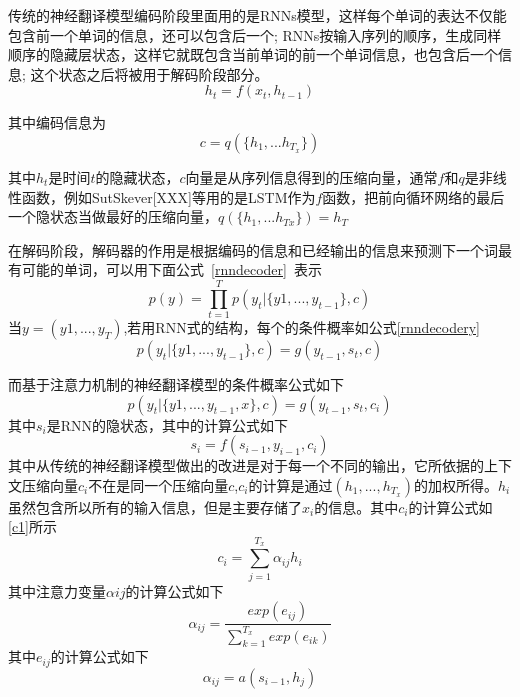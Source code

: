 传统的神经翻译模型编码阶段里面用的是RNNs模型，这样每个单词的表达不仅能包含前一个单词的信息，还可以包含后一个; RNNs按输入序列的顺序，生成同样顺序的隐藏层状态，这样它就既包含当前单词的前一个单词信息，也包含后一个信息; 这个状态之后将被用于解码阶段部分。
\begin{equation}\label{lstm_f} h_t = f(x_t,h_{t-1}) \end{equation}

其中编码信息为
\begin{equation}\label{lstm_f} c = q(\lbrace h_1,...h_{T_x} \rbrace ) \end{equation}

其中$h_t$是时间$t$的隐藏状态，$c$向量是从序列信息得到的压缩向量，通常$f$和$q$是非线性函数，例如SutSkever[XXX]等用的是LSTM作为$f$函数，把前向循环网络的最后一个隐状态当做最好的压缩向量，$q(\lbrace h_1,...h_{Tx} \rbrace )=h_T$

在解码阶段，解码器的作用是根据编码的信息和已经输出的信息来预测下一个词最有可能的单词，可以用下面公式~\ref{rnndecoder}~表示
\begin{equation}\label{rnndecoder} p(y) = \prod_{t=1}^{T} p(y_t|\lbrace y1,...,y_{t-1} \rbrace , c) \end{equation}
当$y=(y1,...,y_{T})$,若用RNN式的结构，每个的条件概率如公式\ref{rnndecodery}
\begin{equation}\label{rnndecodery} p(y_t|\lbrace y1,...,y_{t-1} \rbrace , c) = g(y_{t-1},s_t, c)\end{equation}

而基于注意力机制的神经翻译模型的条件概率公式如下
\begin{equation}\label{} p(y_t|\lbrace y1,...,y_{t-1},x \rbrace , c) = g(y_{t-1},s_t, c_i)\end{equation}
其中$s_i$是RNN的隐状态，其中的计算公式如下
\begin{equation}\label{} s_i = f(s_{i-1},y_{i-1}, c_i)\end{equation}
其中从传统的神经翻译模型做出的改进是对于每一个不同的输出，它所依据的上下文压缩向量$c_i$不在是同一个压缩向量$c$,$c_i$的计算是通过$(h_1,...,h_{T_x})$的加权所得。$h_i$虽然包含所以所有的输入信息，但是主要存储了$x_i$的信息。其中$c_i$的计算公式如\ref{c1}所示
\begin{equation}\label{c1} c_i = \sum_{j=1}^{T_x} \alpha_{ij}h_i\end{equation}
其中注意力变量$\alpha{ij}$的计算公式如下
\begin{equation}\label{alpha} \alpha_{ij} = \frac{exp(e_{ij})}{\sum_{k=1}^{T_x}exp(e_{ik})}\end{equation}
其中$e_{ij}$的计算公式如下
\begin{equation}\label{eij} \alpha_{ij} = a(s_{i-1},h_j)\end{equation}

